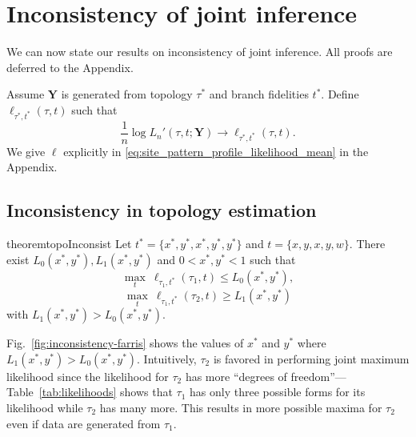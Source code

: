 \documentclass{article}
\newcommand{\fullAlignment}{\mathbf{Y}}
\newcommand{\nCols}{n}
\begin{document}
\section*{Inconsistency of joint inference}

We can now state our results on inconsistency of joint inference.
All proofs are deferred to the Appendix.

Assume $\fullAlignment$ is generated from topology $\tau^*$ and branch fidelities $t^*$.
Define $\ell_{\tau^*,t^*}(\tau, t)$ such that
$$
\frac{1}{n}\log L_\nCols'(\tau, t; \fullAlignment) \rightarrow \ell_{\tau^*,t^*}(\tau, t).
$$
We give $\ell$ explicitly in \eqref{eq:site_pattern_profile_likelihood_mean} in the Appendix.

\subsection*{Inconsistency in topology estimation}

\begin{restatable}{theorem}{topoInconsist}
Let $t^*=\{x^*, y^*, x^*, y^*, y^*\}$ and $t=\{x, y, x, y, w\}$.
There exist $L_0(x^*, y^*), L_1(x^*, y^*)$ and $0 < x^*, y^* < 1$ such that
$$
\max_{t} \ \ell_{\tau_1,t^*}(\tau_1, t) \le L_0(x^*, y^*),
$$
$$
\max_{t} \ \ell_{\tau_1,t^*}(\tau_2, t) \ge L_1(x^*, y^*)
$$
with $L_1(x^*, y^*) > L_0(x^*, y^*)$.
\end{restatable}
Fig.~\ref{fig:inconsistency-farris} shows the values of $x^*$ and $y^*$ where $L_1(x^*, y^*) > L_0(x^*, y^*)$.
Intuitively, $\tau_2$ is favored in performing joint maximum likelihood since the likelihood for $\tau_2$ has more ``degrees of freedom''---Table~\ref{tab:likelihoods} shows that $\tau_1$ has only three possible forms for its likelihood while $\tau_2$ has many more.
This results in more possible maxima for $\tau_2$ even if data are generated from $\tau_1$.
\end{document}
